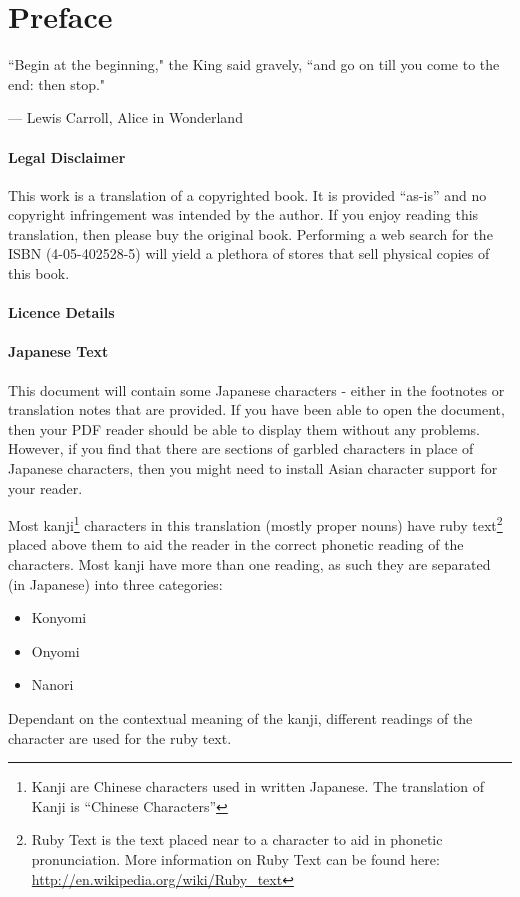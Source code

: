 
\chapter*{Preface}

\epigraph{``Begin at the beginning," the King said gravely, ``and go on till you come to the end: then stop."}{--- \textup{Lewis Carroll}, Alice in Wonderland}

\subsubsection{Legal Disclaimer}
This work is a translation of a copyrighted book. It is provided ``as-is'' and no copyright infringement was intended by the author. If you enjoy reading this translation, then please buy the original book. Performing a web search for the ISBN (4-05-402528-5) will yield a plethora of stores that sell physical copies of this book.

\subsubsection{Licence Details}


\subsubsection{Japanese Text}
This document will contain some Japanese characters - either in the footnotes or translation notes that are provided. If you have been able to open the document, then your PDF reader should be able to display them without any problems. However, if you find that there are sections of garbled characters in place of Japanese characters, then you might need to install Asian character support for your reader.

\par Most kanji\footnote{Kanji are Chinese characters used in written Japanese. The translation of Kanji is ``Chinese Characters''} characters in this translation (mostly proper nouns) have ruby text\footnote{Ruby Text is the text placed near to a character to aid in phonetic pronunciation. More information on Ruby Text can be found here: \url{http://en.wikipedia.org/wiki/Ruby_text}} placed above them to aid the reader in the correct phonetic reading of the characters. Most kanji have more than one reading, as such they are separated (in Japanese) into three categories:
\begin{itemize}
\item Konyomi
\item Onyomi
\item Nanori
\end{itemize}

\par Dependant on the contextual meaning of the kanji, different readings of the character are used for the ruby text.